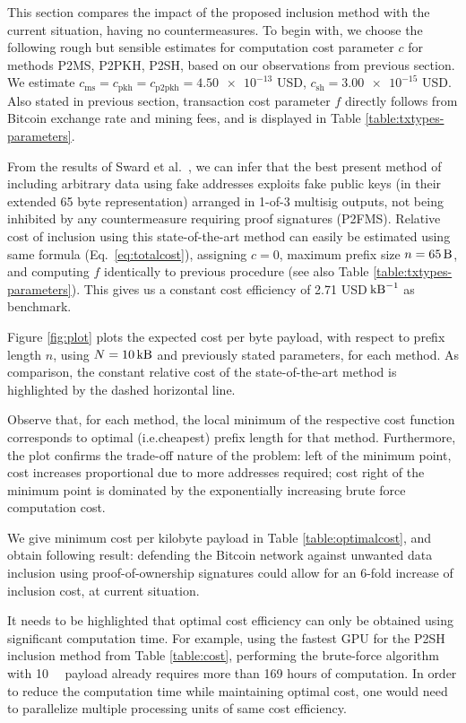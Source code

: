 \documentclass[a4paper,11pt,titlepage]{scrbook}
\begin{document}
This section compares the impact of the proposed inclusion method with the current situation, having no countermeasures.
To begin with, we choose the following rough but sensible estimates for computation cost parameter $c$ for methods P2MS, P2PKH, P2SH, based on our observations from previous section.
We estimate $c_\text{ms}=c_\text{pkh}=c_\text{p2pkh}=\num{4.50e-13}$ USD, $c_\text{sh} = \num{3.00e-15}$ USD.
Also stated in previous section, transaction cost parameter $f$ directly follows from Bitcoin exchange rate and mining fees, and is displayed in Table \ref{table:txtypes-parameters}.

From the results of Sward et al.~\cite[cf.~Table 3]{sward_data_2018}, we can infer that the best present method of including arbitrary data using fake addresses exploits fake public keys (in their extended 65 byte representation) arranged in 1-of-3 multisig outputs, not being inhibited by any countermeasure requiring proof signatures (P2FMS).
Relative cost of inclusion using this state-of-the-art method can easily be estimated using same formula (Eq.~\ref{eq:totalcost}), assigning $c=0$, maximum prefix size $n=\SI{65}{\byte}$, and computing $f$ identically to previous procedure (see also Table \ref{table:txtypes-parameters}).
This gives us a constant cost efficiency of \num{2.71} USD$\,\si{\per\kilo\byte}$ as benchmark.

Figure \ref{fig:plot} plots the expected cost per byte payload, with respect to prefix length $n$, using $N=\SI{10}{\kilo\byte}$ and previously stated parameters, for each method.
As comparison, the constant relative cost of the state-of-the-art method is highlighted by the dashed horizontal line.

Observe that, for each method, the local minimum of the respective cost function corresponds to optimal (i.e.\@ cheapest) prefix length for that method.
Furthermore, the plot confirms the trade-off nature of the problem: left of the minimum point, cost increases proportional due to more addresses required; cost right of the minimum point is dominated by the exponentially increasing brute force computation cost.

We give minimum cost per kilobyte payload in Table \ref{table:optimalcost}, and obtain following result:
defending the Bitcoin network against unwanted data inclusion using proof-of-ownership signatures could allow for an 6-fold increase of inclusion cost, at current situation.

It needs to be highlighted that optimal cost efficiency can only be obtained using significant computation time.
For example, using the fastest GPU for the P2SH inclusion method from Table \ref{table:cost}, performing the brute-force algorithm with \SI{10}{\kilo\byte} payload already requires more than 169 hours of computation.
In order to reduce the computation time while maintaining optimal cost, one would need to parallelize multiple processing units of same cost efficiency.
\end{document}
